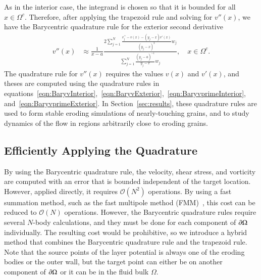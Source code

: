 \documentclass[preprint,10pt]{elsarticle}
\begin{document}
As in the interior case, the integrand is chosen so that it is bounded
for all $x \in \Omega^c$.  Therefore, after applying the trapezoid rule
and solving for $v''(x)$, we have the Barycentric quadrature rule for
the exterior second derivative
\begin{align}
  v''(x) &\approx \frac{1}{x-a}\frac{2\sum\limits_{j=1}^N
    \frac{v^{+}_{j} - v(x) - (y_j-x)v'(x)}{(y_j-x)^3}w_j}
    {\sum\limits_{j=1}^N \frac{(y_j-a)^{-1}}{y_j-x}w_j}, 
    \quad x \in \Omega^c.
\end{align}
The quadrature rule for $v''(x)$ requires the values $v(x)$ and $v'(x)$,
and theses are computed using the quadrature rules in
equations~\eqref{eqn:BaryvInterior},~\eqref{eqn:BaryvExterior},~\eqref{eqn:BaryvprimeInterior},
and~\eqref{eqn:BaryvprimeExterior}. In Section~\ref{sec:results}, these
quadrature rules are used to form stable eroding simulations of
nearly-touching grains, and to study dynamics of the flow in regions
arbitrarily close to eroding grains.

\subsection{Efficiently Applying the Quadrature}
\label{sec:fmm}
By using the Barycentric quadrature rule, the velocity, shear stress,
and vorticity are computed with an error that is bounded independent of
the target location. However, applied directly, it requires
$\mathcal{O}(N^2)$ operations.  By using a fast summation method, such
as the fast multipole method (FMM)~\cite{gre-rok1987}, this cost can be
reduced to $\mathcal{O}(N)$ operations.  However, the Barycentric
quadrature rules require several $N$-body calculations, and they must be
done for each component of ${\partial}\Omega$ individually.  The resulting cost
would be prohibitive, so we introduce a hybrid method that combines the
Barycentric quadrature rule and the trapezoid rule.  Note that the
source points of the layer potential is always one of the eroding bodies
or the outer wall, but the target point can either be on another
component of ${\partial}\Omega$ or it can be in the fluid bulk $\Omega$.
\end{document}

